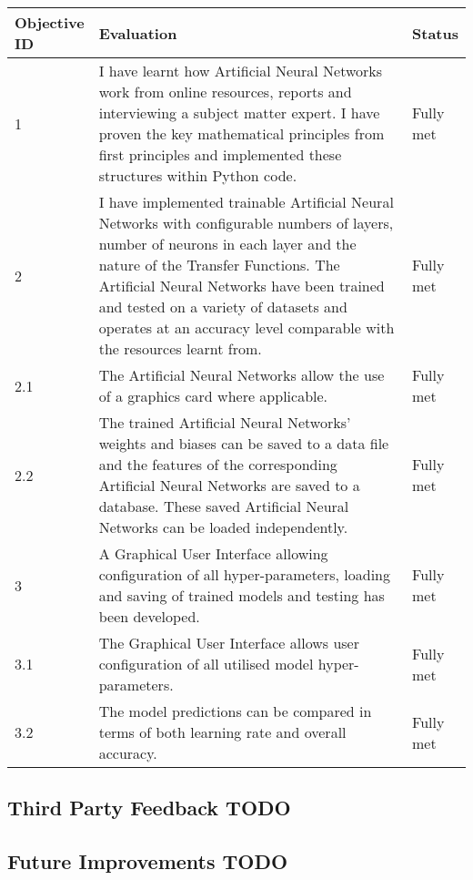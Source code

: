 \documentclass[./project-report/src/latex/project-report.tex]{subfiles}
\begin{document}
\begin{tabular}{|p{0.13\linewidth}|p{0.75\linewidth}|p{0.12\linewidth}|}
    \hline
    \textbf{Objective ID} & \textbf{Evaluation} & \textbf{Status} \\
    \hline
    1 & I have learnt how Artificial Neural Networks work from online resources, reports and interviewing a subject matter expert. I have proven the key mathematical principles from first principles 
        and implemented these structures within Python code. & Fully met \\
    \hline
    2 & I have implemented trainable Artificial Neural Networks with configurable numbers of layers, number of neurons in each layer and the nature of the Transfer Functions. The Artificial Neural 
        Networks have been trained and tested on a variety of datasets and operates at an accuracy level comparable with the resources learnt from. & Fully met \\
    \hline
    2.1 & The Artificial Neural Networks allow the use of a graphics card where applicable. & Fully met \\
    \hline
    2.2 & The trained Artificial Neural Networks' weights and biases can be saved to a data file and the features of the corresponding Artificial Neural Networks are saved to a database. These saved 
          Artificial Neural Networks can be loaded independently. & Fully met \\
    \hline
    3 & A Graphical User Interface allowing configuration of all hyper-parameters, loading and saving of trained models and testing has been developed. & Fully met \\
    \hline
    3.1 & The Graphical User Interface allows user configuration of all utilised model hyper-parameters. & Fully met \\
    \hline
    3.2 & The model predictions can be compared in terms of both learning rate and overall accuracy. & Fully met \\
    \hline
\end{tabular}

\subsection{Third Party Feedback TODO}

\subsection{Future Improvements TODO}
\end{document}

